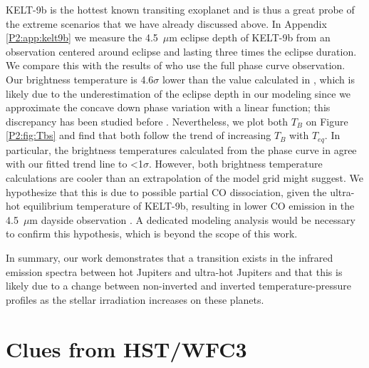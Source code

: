 KELT-9b is the hottest known transiting exoplanet and is thus a great probe of the extreme scenarios that we have already discussed above. In Appendix \ref{P2:app:kelt9b} we measure the 4.5~$\mu$m eclipse depth of KELT-9b from an observation centered around eclipse and lasting three times the eclipse duration. We compare this with the results of \citet{Mansfield2020} who use the full phase curve observation. Our brightness temperature is 4.6$\sigma$ lower than the value calculated in \citet{Mansfield2020}, which is likely due to the underestimation of the eclipse depth in our modeling since we approximate the concave down phase variation with a linear function; this discrepancy has been studied before \citep[e.g.,][]{Bell2019}. Nevertheless, we plot both $T_B$ on Figure \ref{P2:fig:Tbs} and find that both follow the trend of increasing $T_B$ with $T_{eq}$. In particular, the brightness temperatures calculated from the phase curve in \citet{Mansfield2020} agree with our fitted trend line to <1$\sigma$. However, both brightness temperature calculations are cooler than an extrapolation of the model grid might suggest.  We hypothesize that this is due to possible partial CO dissociation, given the ultra-hot equilibrium temperature of KELT-9b, resulting in lower CO emission in the 4.5~$\mu$m dayside observation \citep[e.g.,][]{Kitzmann2018, Lothringer2018}. A dedicated modeling analysis would be necessary to confirm this hypothesis, which is beyond the scope of this work.

In summary, our work demonstrates that a transition exists in the infrared emission spectra between hot Jupiters and ultra-hot Jupiters and that this is likely due to a change between non-inverted and inverted temperature-pressure profiles as the stellar irradiation increases on these planets.

\section{Clues from HST/WFC3}
\label{P2:app:HST}


